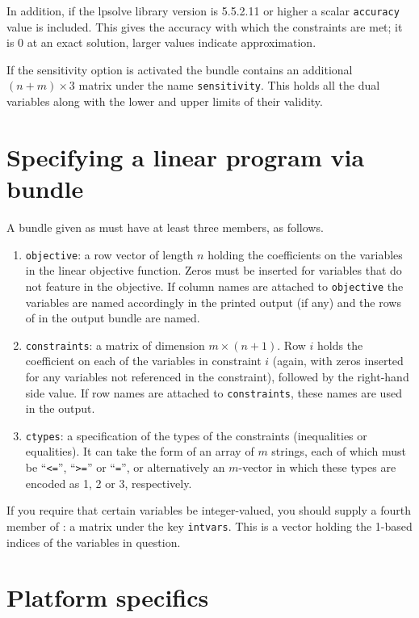 \documentclass{article}
\begin{document}
In addition, if the \textsf{lpsolve} library version is 5.5.2.11 or
higher a scalar \texttt{accuracy} value is included. This gives the
accuracy with which the constraints are met; it is 0 at an exact
solution, larger values indicate approximation.

If the sensitivity option is activated the bundle contains an
additional $(n+m) \times 3$ matrix under the name
\texttt{sensitivity}. This holds all the dual variables along with the
lower and upper limits of their validity.

\section{Specifying a linear program via bundle}
\label{sec:lp-bundle}

A bundle given as  must have at least three
members, as follows.
\begin{enumerate}
\item \texttt{objective}: a row vector of length $n$ holding the
  coefficients on the variables in the linear objective
  function. Zeros must be inserted for variables that do not feature
  in the objective. If column names are attached to
  \texttt{objective} the variables are named accordingly in the
  printed output (if any) and the rows of 
  in the output bundle are named.
\item \texttt{constraints}: a matrix of dimension $m \times
  (n+1)$. Row $i$ holds the coefficient on each of the variables in
  constraint $i$ (again, with zeros inserted for any variables not
  referenced in the constraint), followed by the right-hand side
  value. If row names are attached to \texttt{constraints}, these
  names are used in the output.
\item \texttt{ctypes}: a specification of the types of the constraints
  (inequalities or equalities). It can take the form of an array of
  $m$ strings, each of which must be ``\texttt{<=}'', ``\texttt{>=}''
  or ``\texttt{=}'', or alternatively an $m$-vector in which these
  types are encoded as 1, 2 or 3, respectively.
\end{enumerate}

If you require that certain variables be integer-valued, you should
supply a fourth member of : a matrix under the key
\texttt{intvars}. This is a vector holding the 1-based indices of the
variables in question.

\section{Platform specifics}
\label{sec:platforms}
\end{document}
